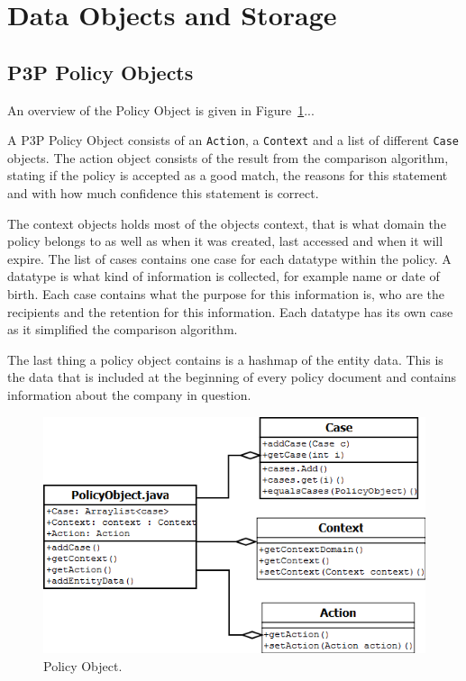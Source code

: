\section{Data Objects and Storage}

\subsection{P3P Policy Objects}\label{p3pPolObj}
An overview of the Policy Object is given in Figure~\ref{po_fig}...

A P3P Policy Object consists of an \texttt{Action}, a \texttt{Context} and a list of different \texttt{Case} objects. The action object consists of the result from the comparison algorithm, stating if the policy is accepted as a good match, the reasons for this statement and with how much confidence this statement is correct.

The context objects holds most of the objects context, that is what domain the policy belongs to as well as when it was created, last accessed and when it will expire. The list of cases contains one case for each datatype within the policy. A datatype is what kind of information is collected, for example name or date of birth. Each case contains what the purpose for this information is, who are the recipients and the retention for this information. Each datatype has its own case as it simplified the comparison algorithm.

The last thing a policy object contains is a hashmap of the entity data. This is the data that is included at the beginning of every policy document and contains information about the company in question.

\begin{figure}[htbp]
\begin{center}
\includegraphics[width = \textwidth]{DesignReport/uml/po.png}
\caption{Policy Object.}
\label{po_fig}
\end{center}
\end{figure}

